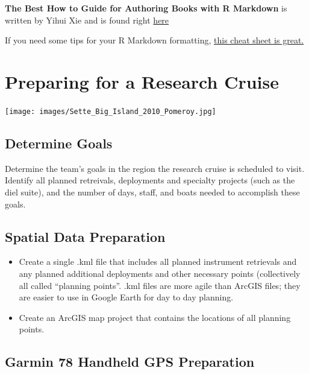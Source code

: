 \documentclass[]{book}
\providecommand{\tightlist}{%
  \setlength{\itemsep}{0pt}\setlength{\parskip}{0pt}}
\begin{document}
\textbf{The Best How to Guide for Authoring Books with R Markdown} is written by Yihui Xie and is found right \href{https://bookdown.org/yihui/bookdown/}{here}

If you need some tips for your R Markdown formatting, \href{https://rmarkdown.rstudio.com/lesson-15.html}{this cheat sheet is great.}

\hypertarget{cruise_prep}{%
\chapter{Preparing for a Research Cruise}\label{cruise_prep}}

\texttt{[image: images/Sette\_Big\_Island\_2010\_Pomeroy.jpg]}

\hypertarget{determine-goals}{%
\section{Determine Goals}\label{determine-goals}}

Determine the team's goals in the region the research cruise is scheduled to visit. Identify all planned retreivals, deployments and specialty projects (such as the diel suite), and the number of days, staff, and boats needed to accomplish these goals.

\hypertarget{htmlwidget-eedfb1102584adc6687d}{}

\hypertarget{spatial-data-preparation}{%
\section{Spatial Data Preparation}\label{spatial-data-preparation}}

\begin{itemize}
\tightlist
\item
  Create a single .kml file that includes all planned instrument retrievals and any planned additional deployments and other necessary points (collectively all called ``planning points''. .kml files are more agile than ArcGIS files; they are easier to use in Google Earth for day to day planning.
\item
  Create an ArcGIS map project that contains the locations of all planning points.
\end{itemize}

\hypertarget{garmin-78-handheld-gps-preparation}{%
\section{Garmin 78 Handheld GPS Preparation}\label{garmin-78-handheld-gps-preparation}}
\end{document}
